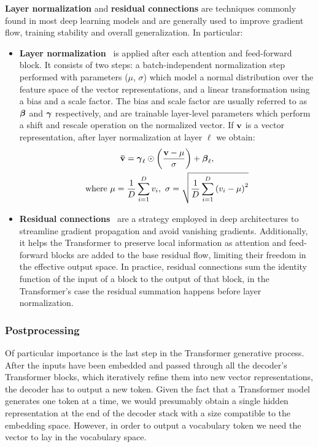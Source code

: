 \textbf{Layer normalization} and \textbf{residual connections} are techniques commonly found in most deep learning models and are generally used to improve gradient flow, training stability and overall generalization.
In particular:
\begin{itemize}
    \item \textbf{Layer normalization}~\cite{ba2016} is applied after each attention and feed-forward block.
It consists of two steps: a batch-independent normalization step performed with parameters ($\mu$, $\sigma$) which model a normal distribution over the feature space of the vector representations, and a linear transformation using a bias and a scale factor.
The bias and scale factor are usually referred to as $\bm{\mathbf{\beta}}$ and $\bm{\mathbf{\gamma}}$ respectively, and are trainable layer-level parameters which perform a shift and rescale operation on the normalized vector.
If $\bm{\mathbf{v}}$ is a vector representation, after layer normalization at layer $\ell$ we obtain:
\begin{subequations}
    \begin{gather}
        \bm{\mathbf{\bar v}} = \bm{\mathbf{\gamma}}_\ell \odot \left( \frac{\bm{\mathbf{v}} - \mu}{\sigma} \right) + \bm{\mathbf{\beta}}_\ell, \label{eq:background_layernorm} \\
        \text{where}\ \mu = \frac{1}{D}\sum_{i=1}^{D}{v_i},\ \sigma = \sqrt{\frac{1}{D}\sum_{i=1}^{D}{{(v_i - \mu)}^2}} \label{eq:background_layernorm_extra}
    \end{gather}
\end{subequations}
    \item \textbf{Residual connections}~\cite{he2016} are a strategy employed in deep architectures to streamline gradient propagation and avoid vanishing gradients.
Additionally, it helps the Transformer to preserve local information as attention and feed-forward blocks are added to the base residual flow, limiting their freedom in the effective output space.
In practice, residual connections sum the identity function of the input of a block to the output of that block, in the Transformer's case the residual summation happens before layer normalization.
\end{itemize}

\subsubsection*{Postprocessing}

Of particular importance is the last step in the Transformer generative process.
After the inputs have been embedded and passed through all the decoder's Transformer blocks, which iteratively refine them into new vector representations, the decoder has to output a new token.
Given the fact that a Transformer model generates one token at a time, we would presumably obtain a single hidden representation at the end of the decoder stack with a size compatible to the embedding space.
However, in order to output a vocabulary token we need the vector to lay in the vocabulary space.

